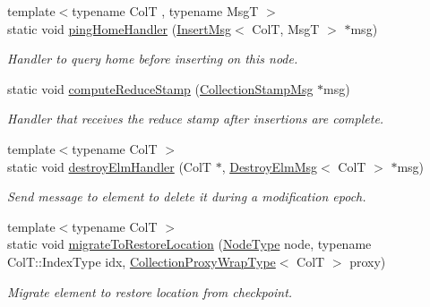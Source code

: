 \begin{DoxyCompactItemize}
{\footnotesize template$<$typename ColT , typename MsgT $>$ }\\static void \hyperlink{structvt_1_1vrt_1_1collection_1_1_collection_manager_af5d0c9d39e7d86dc7a2afb7b294e5fe1}{ping\+Home\+Handler} (\hyperlink{structvt_1_1vrt_1_1collection_1_1_insert_msg}{Insert\+Msg}$<$ ColT, MsgT $>$ $\ast$msg)
\begin{DoxyCompactList}\small\item\em Handler to query home before inserting on this node. \end{DoxyCompactList}\item 
static void \hyperlink{structvt_1_1vrt_1_1collection_1_1_collection_manager_aee32428b23705756658c5e27f336725e}{compute\+Reduce\+Stamp} (\hyperlink{structvt_1_1vrt_1_1collection_1_1_collection_stamp_msg}{Collection\+Stamp\+Msg} $\ast$msg)
\begin{DoxyCompactList}\small\item\em Handler that receives the reduce stamp after insertions are complete. \end{DoxyCompactList}\item 
{\footnotesize template$<$typename ColT $>$ }\\static void \hyperlink{structvt_1_1vrt_1_1collection_1_1_collection_manager_aa0da0fa8fcb6e81e462e3e0e87d0e9d4}{destroy\+Elm\+Handler} (ColT $\ast$, \hyperlink{structvt_1_1vrt_1_1collection_1_1_destroy_elm_msg}{Destroy\+Elm\+Msg}$<$ ColT $>$ $\ast$msg)
\begin{DoxyCompactList}\small\item\em Send message to element to delete it during a modification epoch. \end{DoxyCompactList}\item 
{\footnotesize template$<$typename ColT $>$ }\\static void \hyperlink{structvt_1_1vrt_1_1collection_1_1_collection_manager_ad3c1633ce18a91dadacf3e5038a8b7df}{migrate\+To\+Restore\+Location} (\hyperlink{namespacevt_a866da9d0efc19c0a1ce79e9e492f47e2}{Node\+Type} node, typename Col\+T\+::\+Index\+Type idx, \hyperlink{structvt_1_1vrt_1_1collection_1_1_collection_manager_a56458ed7f9bb22b631b9b3a745f42f94}{Collection\+Proxy\+Wrap\+Type}$<$ ColT $>$ proxy)
\begin{DoxyCompactList}\small\item\em Migrate element to restore location from checkpoint. \end{DoxyCompactList}\end{DoxyCompactItemize}
